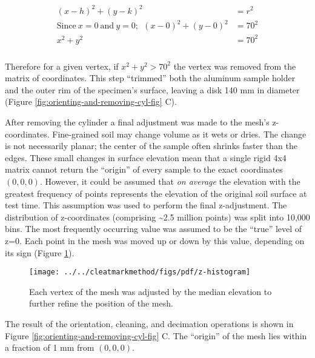 \documentclass[
  letterpaper,
  openany]{book}
\begin{document}
\begin{align}
        \begin{split}
            (x - h)^2 + (y - k)^2 &= r^2 \\
            \mathrm{Since}~x=0~\mathrm{and}~y=0;~~ (x - 0)^2 + (y - 0)^2 &= 70^2 \\
            x^2 +y^2 &= 70^2 \\
        \end{split} 
\label{eq:cylinder-clipping-equation} 
\end{align}

Therefore for a given vertex, if \(x^2+y^2>70^2\) the vertex was removed from the matrix of coordinates.
This step ``trimmed'' both the aluminum sample holder and the outer rim of the specimen's surface, leaving a disk 140 mm in diameter (Figure \ref{fig:orienting-and-removing-cyl-fig} C).

After removing the cylinder a final adjustment was made to the mesh's z-coordinates.
Fine-grained soil may change volume as it wets or dries.
The change is not necessarily planar; the center of the sample often shrinks faster than the edges.
These small changes in surface elevation mean that a single rigid 4x4 matrix cannot return the ``origin'' of every sample to the exact coordinates \((0, 0, 0)\).
However, it could be assumed that \emph{on average} the elevation with the greatest frequency of points represents the elevation of the original soil surface at test time.
This assumption was used to perform the final z-adjustment.
The distribution of z-coordinates (comprising \textasciitilde2.5 million points) was split into 10,000 bins.
The most frequently occurring value was assumed to be the ``true'' level of z=0.
Each point in the mesh was moved up or down by this value, depending on its sign (Figure \ref{fig:mesh-z-points-histogram}).

\begin{figure}

{\centering \texttt{[image: ../../cleatmarkmethod/figs/pdf/z-histogram]} 

}

\caption[Final adjustment of mesh z-coordinates]{Each vertex of the mesh was adjusted by the median elevation to further refine the position of the mesh.}\label{fig:mesh-z-points-histogram}
\end{figure}

The result of the orientation, cleaning, and decimation operations is shown in Figure \ref{fig:orienting-and-removing-cyl-fig} C.
The ``origin'' of the mesh lies within a fraction of 1 mm from \((0, 0, 0)\).
\end{document}
